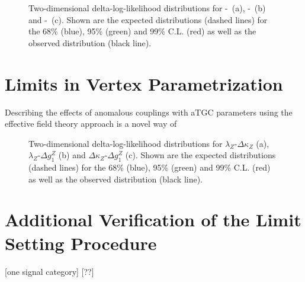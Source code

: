 \begin{figure}
	\centering
	\caption[Two-dimensional delta-log-likelihood distributions for the three combinations of aTGC parameters]{Two-dimensional delta-log-likelihood distributions for \Tcwww -\Tccw \ (a), \Tcwww -\Tcb \ (b) and \Tccw -\Tcb\ (c). Shown are the expected distributions (dashed lines) for the 68\% (blue), 95\% (green) and 99\% C.L. (red) as well as the observed distribution (black line).}
	\label{fig:limits:2dlimits}	
\end{figure}

\section{Limits in Vertex Parametrization}
\label{sec:vertex}
Describing the effects of anomalous couplings with aTGC parameters using the effective field theory approach is a novel way of 

\begin{figure}
	\centering
	\caption[Two-dimensional delta-log-likelihood distributions for the three combinations of aTGC parameters in the vertex parametrization]{Two-dimensional delta-log-likelihood distributions for $\lambda_Z$-$\Delta\kappa_Z$ (a), $\lambda_Z$-$\Delta g_1^Z$ (b) and $\Delta\kappa_Z$-$\Delta g_1^Z$ (c). Shown are the expected distributions (dashed lines) for the 68\% (blue), 95\% (green) and 99\% C.L. (red) as well as the observed distribution (black line).}
	\label{fig:limits:2dlimitsvertex}	
\end{figure}

\section{Additional Verification of the Limit Setting Procedure}
[one signal category]
[??]
